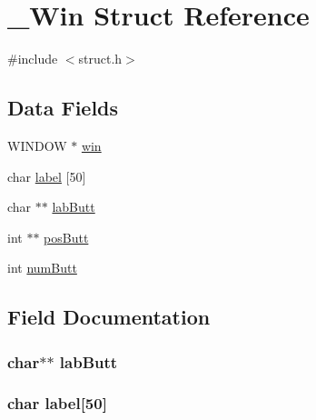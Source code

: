 \hypertarget{struct___win}{}\section{\+\_\+\+Win Struct Reference}
\label{struct___win}


{\ttfamily \#include $<$struct.\+h$>$}

\subsection*{Data Fields}
\begin{DoxyCompactItemize}
\item 
W\+I\+N\+D\+OW $\ast$ \hyperlink{struct___win_a09d962b38c0d24e36078d717d2a6ed96}{win}
\item 
char \hyperlink{struct___win_a80059d6954dd5c12e38fd5cafe1a16cc}{label} \mbox{[}50\mbox{]}
\item 
char $\ast$$\ast$ \hyperlink{struct___win_aff6ffec032f54ef65d0b880416f8246d}{lab\+Butt}
\item 
int $\ast$$\ast$ \hyperlink{struct___win_a6d6060115df541c075d8f529a1511d26}{pos\+Butt}
\item 
int \hyperlink{struct___win_a1910eef8db510628192f27b24cdd0eb2}{num\+Butt}
\end{DoxyCompactItemize}


\subsection{Field Documentation}
\subsubsection[{\texorpdfstring{lab\+Butt}{labButt}}]{\setlength{\rightskip}{0pt plus 5cm}char$\ast$$\ast$ lab\+Butt}\hypertarget{struct___win_aff6ffec032f54ef65d0b880416f8246d}{}\label{struct___win_aff6ffec032f54ef65d0b880416f8246d}
\subsubsection[{\texorpdfstring{label}{label}}]{\setlength{\rightskip}{0pt plus 5cm}char label\mbox{[}50\mbox{]}}\hypertarget{struct___win_a80059d6954dd5c12e38fd5cafe1a16cc}{}\label{struct___win_a80059d6954dd5c12e38fd5cafe1a16cc}
